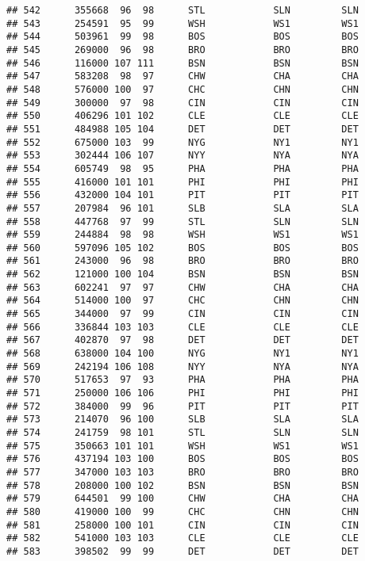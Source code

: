 \documentclass[]{article}
\begin{document}
\begin{verbatim}
## 542      355668  96  98      STL            SLN         SLN
## 543      254591  95  99      WSH            WS1         WS1
## 544      503961  99  98      BOS            BOS         BOS
## 545      269000  96  98      BRO            BRO         BRO
## 546      116000 107 111      BSN            BSN         BSN
## 547      583208  98  97      CHW            CHA         CHA
## 548      576000 100  97      CHC            CHN         CHN
## 549      300000  97  98      CIN            CIN         CIN
## 550      406296 101 102      CLE            CLE         CLE
## 551      484988 105 104      DET            DET         DET
## 552      675000 103  99      NYG            NY1         NY1
## 553      302444 106 107      NYY            NYA         NYA
## 554      605749  98  95      PHA            PHA         PHA
## 555      416000 101 101      PHI            PHI         PHI
## 556      432000 104 101      PIT            PIT         PIT
## 557      207984  96 101      SLB            SLA         SLA
## 558      447768  97  99      STL            SLN         SLN
## 559      244884  98  98      WSH            WS1         WS1
## 560      597096 105 102      BOS            BOS         BOS
## 561      243000  96  98      BRO            BRO         BRO
## 562      121000 100 104      BSN            BSN         BSN
## 563      602241  97  97      CHW            CHA         CHA
## 564      514000 100  97      CHC            CHN         CHN
## 565      344000  97  99      CIN            CIN         CIN
## 566      336844 103 103      CLE            CLE         CLE
## 567      402870  97  98      DET            DET         DET
## 568      638000 104 100      NYG            NY1         NY1
## 569      242194 106 108      NYY            NYA         NYA
## 570      517653  97  93      PHA            PHA         PHA
## 571      250000 106 106      PHI            PHI         PHI
## 572      384000  99  96      PIT            PIT         PIT
## 573      214070  96 100      SLB            SLA         SLA
## 574      241759  98 101      STL            SLN         SLN
## 575      350663 101 101      WSH            WS1         WS1
## 576      437194 103 100      BOS            BOS         BOS
## 577      347000 103 103      BRO            BRO         BRO
## 578      208000 100 102      BSN            BSN         BSN
## 579      644501  99 100      CHW            CHA         CHA
## 580      419000 100  99      CHC            CHN         CHN
## 581      258000 100 101      CIN            CIN         CIN
## 582      541000 103 103      CLE            CLE         CLE
## 583      398502  99  99      DET            DET         DET

\end{verbatim}
\end{document}
